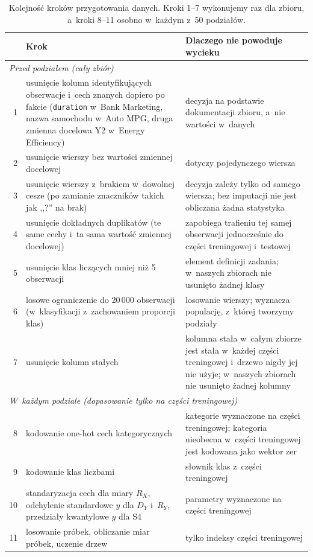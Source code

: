 \documentclass[11pt,a4paper]{article}
\begin{document}
\begin{table}[!htbp]
\centering\small
\caption{Kolejność kroków przygotowania danych. Kroki 1--7 wykonujemy raz dla zbioru, a~kroki 8--11 osobno w~każdym z~50 podziałów.}
\label{tab:prep}
\begin{tabularx}{\textwidth}{r>{\raggedright\arraybackslash}p{}>{\raggedright\arraybackslash}X}
\toprule
& \textbf{Krok} & \textbf{Dlaczego nie powoduje wycieku} \\
\midrule
\multicolumn{3}{l}{\emph{Przed podziałem (cały zbiór)}}\\
1 & usunięcie kolumn identyfikujących obserwacje i~cech znanych dopiero po fakcie (\texttt{duration} w~Bank Marketing, nazwa samochodu w~Auto MPG, druga zmienna docelowa Y2 w~Energy Efficiency) & decyzja na podstawie dokumentacji zbioru, a~nie wartości w~danych \\
2 & usunięcie wierszy bez wartości zmiennej docelowej & dotyczy pojedynczego wiersza \\
3 & usunięcie wierszy z~brakiem w~dowolnej cesze (po zamianie znaczników takich jak ,,?'' na brak) & decyzja zależy tylko od samego wiersza; bez imputacji nie jest obliczana żadna statystyka \\
4 & usunięcie dokładnych duplikatów (te same cechy i~ta sama wartość zmiennej docelowej) & zapobiega trafieniu tej samej obserwacji jednocześnie do części treningowej i~testowej \\
5 & usunięcie klas liczących mniej niż 5 obserwacji & element definicji zadania; w~naszych zbiorach nie usunięto żadnej klasy \\
6 & losowe ograniczenie do 20\,000 obserwacji (w~klasyfikacji z~zachowaniem proporcji klas) & losowanie wierszy; wyznacza populację, z~której tworzymy podziały \\
7 & usunięcie kolumn stałych & kolumna stała w~całym zbiorze jest stała w~każdej części treningowej i~drzewo nigdy jej nie użyje; w~naszych zbiorach nie usunięto żadnej kolumny \\
\midrule
\multicolumn{3}{l}{\emph{W~każdym podziale (dopasowanie tylko na części treningowej)}}\\
8 & kodowanie one-hot cech kategorycznych & kategorie wyznaczone na części treningowej; kategoria nieobecna w~części treningowej jest kodowana jako wektor zer \\
9 & kodowanie klas liczbami & słownik klas z~części treningowej \\
10 & standaryzacja cech dla miary $R_X$, odchylenie standardowe $y$ dla $D_Y$ i~$R_Y$, przedziały kwantylowe $y$ dla S4 & parametry wyznaczone na części treningowej \\
11 & losowanie próbek, obliczanie miar próbek, uczenie drzew & tylko indeksy części treningowej \\
\bottomrule
\end{tabularx}
\end{table}
\end{document}
